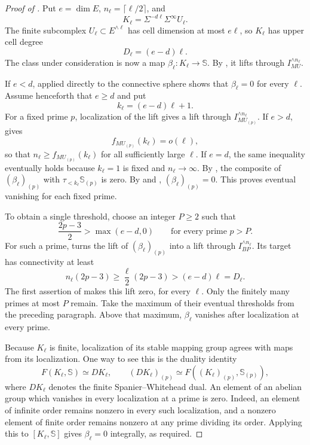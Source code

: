 \begin{proof}[Proof of ]
Put $e=\dim E$, $n_\ell=\lceil\ell/2\rceil$, and
\[
K_\ell=\Sigma^{-d\ell}\Sigma^\infty U_\ell.
\]
The finite subcomplex $U_\ell\subset E^{\wedge\ell}$ has cell
dimension at most $e\ell$, so $K_\ell$ has upper cell degree
\begin{equation}
\label{eq:filtered-product-cell-bound}
D_\ell=(e-d)\ell.
\end{equation}
The class under consideration is now a map
$\beta_\ell:K_\ell\to\mathbb S$.
By , it lifts through
$I_{MU}^{\wedge n_\ell}$.

If $e<d$,  applied directly to the
connective sphere shows that $\beta_\ell=0$ for every $\ell$.
Assume henceforth that $e\geq d$ and put
\[
k_\ell=(e-d)\ell+1.
\]
For a fixed prime $p$, localization of the lift gives a lift through
$I_{MU_{(p)}}^{\wedge n_\ell}$.  If $e>d$,
 gives
\[
f_{MU_{(p)}}(k_\ell)=o(\ell),
\]
so that $n_\ell\geq f_{MU_{(p)}}(k_\ell)$ for all sufficiently
large $\ell$.  If $e=d$, the same inequality eventually holds
because $k_\ell=1$ is fixed and $n_\ell\to\infty$.
By , the composite of
$(\beta_\ell)_{(p)}$ with $\tau_{<k_\ell}\mathbb S_{(p)}$ is
zero.  By  and
, $(\beta_\ell)_{(p)}=0$.
This proves eventual vanishing for each fixed prime.

To obtain a single threshold, choose an integer $P\geq2$ such that
\begin{equation}
\label{eq:filtered-product-prime-cutoff}
\frac{2p-3}{2}>\max(e-d,0)
\qquad\text{for every prime }p>P.
\end{equation}
For such a prime,  turns the lift of
$(\beta_\ell)_{(p)}$ into a lift through $I_{BP}^{\wedge n_\ell}$.
Its target has connectivity at least
\[
n_\ell(2p-3)\geq\frac\ell2(2p-3)>(e-d)\ell=D_\ell.
\]
The first assertion of  makes this lift
zero, for every $\ell$.  Only the finitely many primes at most $P$
remain.  Take the maximum of their eventual thresholds from the
preceding paragraph.  Above that maximum, $\beta_\ell$ vanishes
after localization at every prime.

Because $K_\ell$ is finite, localization of its stable mapping group
agrees with maps from its localization.  One way to see this is the
duality identity
\[
F(K_\ell,\mathbb S)\simeq D K_\ell,
\qquad
(D K_\ell)_{(p)}\simeq
F((K_\ell)_{(p)},\mathbb S_{(p)}),
\]
where $D K_\ell$ denotes the finite Spanier--Whitehead dual.
An element of an abelian group which vanishes in every localization
at a prime is zero.  Indeed, an element of infinite order remains
nonzero in every such localization, and a nonzero element of finite
order remains nonzero at any prime dividing its order.  Applying this
to $[K_\ell,\mathbb S]$ gives $\beta_\ell=0$ integrally, as required.
\end{proof}

